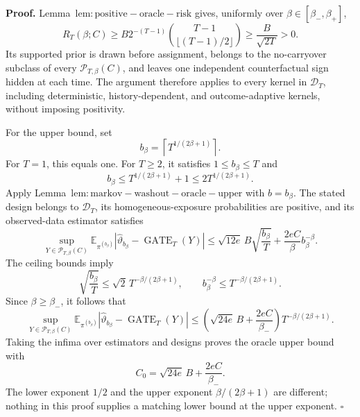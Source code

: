 \textbf{Proof.} Lemma~\(\mathrm{lem:positive-oracle-risk}\) gives, uniformly over \(\beta\in[\beta_-,\beta_+]\),
\[
R_T(\beta;C)
\ge B2^{-(T-1)}\binom{T-1}{\lfloor(T-1)/2\rfloor}
\ge\frac{B}{\sqrt{2T}}>0.
\]
Its supported prior is drawn before assignment, belongs to the no-carryover subclass of every \(\mathcal P_{T,\beta}(C)\), and leaves one independent counterfactual sign hidden at each time. The argument therefore applies to every kernel in \(\mathcal D_T\), including deterministic, history-dependent, and outcome-adaptive kernels, without imposing positivity.

For the upper bound, set
\[
b_\beta=\left\lceil T^{1/(2\beta+1)}\right\rceil.
\]
For \(T=1\), this equals one. For \(T\ge2\), it satisfies \(1\le b_\beta\le T\) and
\[
b_\beta\le T^{1/(2\beta+1)}+1
\le2T^{1/(2\beta+1)}.
\]
Apply Lemma~\(\mathrm{lem:markov-washout-oracle-upper}\) with \(b=b_\beta\). The stated design belongs to \(\mathcal D_T\), its homogeneous-exposure probabilities are positive, and its observed-data estimator satisfies
\[
\sup_{Y\in\mathcal P_{T,\beta}(C)}
\mathbb E_{\pi^{(b_\beta)}}|\widehat\vartheta_{b_\beta}-\operatorname{GATE}_T(Y)|
\le\sqrt{12e}\,B\sqrt{\frac{b_\beta}{T}}
+\frac{2eC}{\beta}b_\beta^{-\beta}.
\]
The ceiling bounds imply
\[
\sqrt{\frac{b_\beta}{T}}
\le\sqrt2\,T^{-\beta/(2\beta+1)},
\qquad
b_\beta^{-\beta}\le T^{-\beta/(2\beta+1)}.
\]
Since \(\beta\ge\beta_-\), it follows that
\[
\sup_{Y\in\mathcal P_{T,\beta}(C)}
\mathbb E_{\pi^{(b_\beta)}}|\widehat\vartheta_{b_\beta}-\operatorname{GATE}_T(Y)|
\le\left(\sqrt{24e}\,B+\frac{2eC}{\beta_-}\right)
T^{-\beta/(2\beta+1)}.
\]
Taking the infima over estimators and designs proves the oracle upper bound with
\[
C_0=\sqrt{24e}\,B+\frac{2eC}{\beta_-}.
\]
The lower exponent \(1/2\) and the upper exponent \(\beta/(2\beta+1)\) are different; nothing in this proof supplies a matching lower bound at the upper exponent. \(\square\)